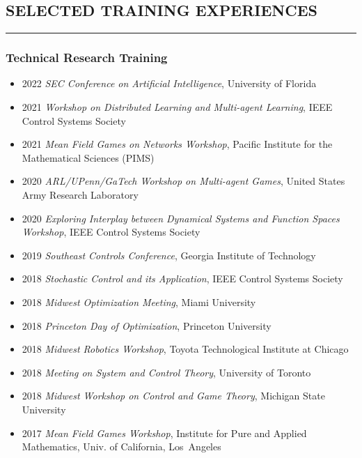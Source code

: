 \documentclass{article}
\begin{document}
\subsection*{SELECTED TRAINING EXPERIENCES}
\vspace{-2pt}
\hrule
\vspace{5pt}

\subsubsection*{Technical Research Training}
\vspace{-6pt}
\begin{itemize}
\setlength\itemsep{-2 pt}
\setlength{\itemindent}{-25 pt}

\item[] 2022 {\textit{SEC Conference on Artificial Intelligence}, \hfill University of Florida}
\item[] 2021 {\textit{Workshop on Distributed Learning and Multi-agent Learning}, \hfill IEEE Control Systems Society}
\item[] 2021 {\textit{Mean Field Games on Networks Workshop}, \hfill Pacific Institute for the Mathematical Sciences (PIMS)}
\item[] 2020 {\textit{ARL/UPenn/GaTech Workshop on Multi-agent Games}, \hfill United States Army Research Laboratory} 
\item[] 2020 {\textit{Exploring Interplay between Dynamical Systems and Function Spaces Workshop}, \hfill IEEE Control Systems Society}
\item[] 2019 {\textit{Southeast Controls Conference}, \hfill Georgia Institute of Technology}
\item[] 2018 {\textit{Stochastic Control and its Application}, \hfill IEEE Control Systems Society}
\item[] 2018 {\textit{Midwest Optimization Meeting}, \hfill Miami University}
\item[] 2018 {\textit{Princeton Day of Optimization}, \hfill Princeton University}
\item[] 2018 {\textit{Midwest Robotics Workshop}, \hfill Toyota Technological Institute at Chicago}
\item[] 2018 {\textit{Meeting on System and Control Theory}, \hfill University of Toronto}
\item[] 2018 {\textit{Midwest Workshop on Control and Game Theory}, \hfill Michigan State University}
\item[] 2017 {\textit{Mean Field Games Workshop}, \hfill Institute for Pure and Applied Mathematics, Univ. of California, Los~Angeles}

\end{itemize}
\end{document}
